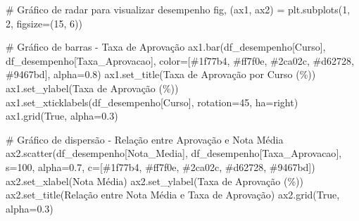 \documentclass[
  12pt,
  letterpaper,
]{report}
\newenvironment{Shaded}{\begin{snugshade}}{\end{snugshade}}
\newcommand{\CommentTok}[1]{\textcolor[rgb]{0.37,0.37,0.37}{#1}}
\newcommand{\DecValTok}[1]{\textcolor[rgb]{0.68,0.00,0.00}{#1}}
\newcommand{\FloatTok}[1]{\textcolor[rgb]{0.68,0.00,0.00}{#1}}
\newcommand{\NormalTok}[1]{\textcolor[rgb]{0.00,0.23,0.31}{#1}}
\newcommand{\OperatorTok}[1]{\textcolor[rgb]{0.37,0.37,0.37}{#1}}
\newcommand{\StringTok}[1]{\textcolor[rgb]{0.13,0.47,0.30}{#1}}
\newcommand{\VariableTok}[1]{\textcolor[rgb]{0.07,0.07,0.07}{#1}}
\begin{document}
\begin{Shaded}
\begin{Highlighting}[]
\CommentTok{\# Gráfico de radar para visualizar desempenho}
\NormalTok{fig, (ax1, ax2) }\OperatorTok{=}\NormalTok{ plt.subplots(}\DecValTok{1}\NormalTok{, }\DecValTok{2}\NormalTok{, figsize}\OperatorTok{=}\NormalTok{(}\DecValTok{15}\NormalTok{, }\DecValTok{6}\NormalTok{))}

\CommentTok{\# Gráfico de barras {-} Taxa de Aprovação}
\NormalTok{ax1.bar(df\_desempenho[}\StringTok{\textquotesingle{}Curso\textquotesingle{}}\NormalTok{], df\_desempenho[}\StringTok{\textquotesingle{}Taxa\_Aprovacao\textquotesingle{}}\NormalTok{], }
\NormalTok{        color}\OperatorTok{=}\NormalTok{[}\StringTok{\textquotesingle{}\#1f77b4\textquotesingle{}}\NormalTok{, }\StringTok{\textquotesingle{}\#ff7f0e\textquotesingle{}}\NormalTok{, }\StringTok{\textquotesingle{}\#2ca02c\textquotesingle{}}\NormalTok{, }\StringTok{\textquotesingle{}\#d62728\textquotesingle{}}\NormalTok{, }\StringTok{\textquotesingle{}\#9467bd\textquotesingle{}}\NormalTok{], alpha}\OperatorTok{=}\FloatTok{0.8}\NormalTok{)}
\NormalTok{ax1.set\_title(}\StringTok{\textquotesingle{}Taxa de Aprovação por Curso (\%)\textquotesingle{}}\NormalTok{)}
\NormalTok{ax1.set\_ylabel(}\StringTok{\textquotesingle{}Taxa de Aprovação (\%)\textquotesingle{}}\NormalTok{)}
\NormalTok{ax1.set\_xticklabels(df\_desempenho[}\StringTok{\textquotesingle{}Curso\textquotesingle{}}\NormalTok{], rotation}\OperatorTok{=}\DecValTok{45}\NormalTok{, ha}\OperatorTok{=}\StringTok{\textquotesingle{}right\textquotesingle{}}\NormalTok{)}
\NormalTok{ax1.grid(}\VariableTok{True}\NormalTok{, alpha}\OperatorTok{=}\FloatTok{0.3}\NormalTok{)}

\CommentTok{\# Gráfico de dispersão {-} Relação entre Aprovação e Nota Média}
\NormalTok{ax2.scatter(df\_desempenho[}\StringTok{\textquotesingle{}Nota\_Media\textquotesingle{}}\NormalTok{], df\_desempenho[}\StringTok{\textquotesingle{}Taxa\_Aprovacao\textquotesingle{}}\NormalTok{], }
\NormalTok{           s}\OperatorTok{=}\DecValTok{100}\NormalTok{, alpha}\OperatorTok{=}\FloatTok{0.7}\NormalTok{, c}\OperatorTok{=}\NormalTok{[}\StringTok{\textquotesingle{}\#1f77b4\textquotesingle{}}\NormalTok{, }\StringTok{\textquotesingle{}\#ff7f0e\textquotesingle{}}\NormalTok{, }\StringTok{\textquotesingle{}\#2ca02c\textquotesingle{}}\NormalTok{, }\StringTok{\textquotesingle{}\#d62728\textquotesingle{}}\NormalTok{, }\StringTok{\textquotesingle{}\#9467bd\textquotesingle{}}\NormalTok{])}
\NormalTok{ax2.set\_xlabel(}\StringTok{\textquotesingle{}Nota Média\textquotesingle{}}\NormalTok{)}
\NormalTok{ax2.set\_ylabel(}\StringTok{\textquotesingle{}Taxa de Aprovação (\%)\textquotesingle{}}\NormalTok{)}
\NormalTok{ax2.set\_title(}\StringTok{\textquotesingle{}Relação entre Nota Média e Taxa de Aprovação\textquotesingle{}}\NormalTok{)}
\NormalTok{ax2.grid(}\VariableTok{True}\NormalTok{, alpha}\OperatorTok{=}\FloatTok{0.3}\NormalTok{)}


\end{Highlighting}
\end{Shaded}
\end{document}
